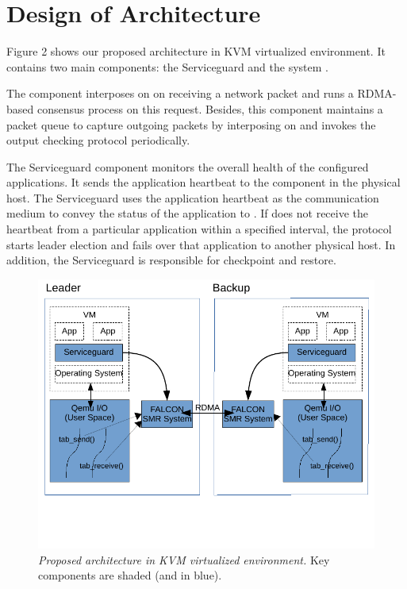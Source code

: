 \section{Design of Architecture} \label{sec:overview}

Figure 2 shows our proposed architecture in KVM virtualized environment. 
It contains two main components: the Serviceguard and the \smr system \smrsystem .

The \smrsystem component interposes on \tapsend on receiving a network packet 
and runs a RDMA-based consensus process on this request. Besides, this component 
maintains a packet queue to capture outgoing packets by interposing on 
\taprecv and invokes the output checking protocol periodically. 

The Serviceguard component monitors the overall health of the configured applications. 
It sends the application heartbeat to the \smrsystem component in the physical 
host. The Serviceguard uses the application heartbeat as the communication 
medium to convey the status of the application to \smrsystem. If \smrsystem does not 
receive the heartbeat from a particular application within a specified interval, 
the protocol starts leader election and fails over that application to another physical 
host. In addition, the Serviceguard is responsible for checkpoint and restore. 

\begin{figure}[t]
\centering
\includegraphics[width=.47\textwidth]{figures/arch}
\vspace{-.2in}
\caption{{\em Proposed architecture in KVM virtualized environment.} Key components are shaded (and
in blue).} \label{fig:arc}
\vspace{.05in}
\end{figure}
